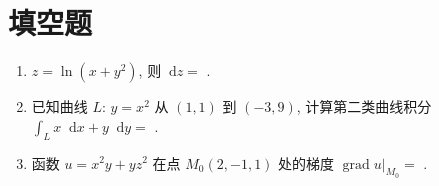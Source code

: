 \documentclass[twocolumn,UTF8]{ctexart}
\newcommand\dif{\mathop{}\!\mathrm{d}}
\DeclareMathOperator{\grad}{grad}
\begin{document}
\section{填空题}
 \begin{enumerate}
\item $z=\ln(x+y^2)$, 则$\dif z=$ \underline{\hspace{2.5cm}}.\\[-0.3cm]
\item 已知曲线 $L:\,y=x^2$ 从 $(1,1)$ 到 $(-3,9)$, 计算第二类曲线积分 $\int_Lx\dif x+y\dif y=$ \underline{\hspace{1.3cm}}.\\[-0.3cm]
\item 函数 $u=x^2y+yz^2$ 在点 $M_0(2,-1,1)$ 处的梯度 $\grad u\Big|_{M_0}=$ \underline{\hspace{3.5cm}}.\\[-0.6cm]
\end{enumerate}
\end{document}
